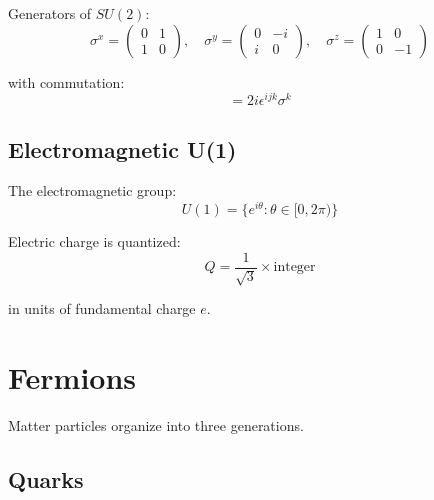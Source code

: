 \begin{theorem}
\label{fa_20:thm:pauli}
Generators of $SU(2)$:
\begin{equation}
\sigma^x = \begin{pmatrix}0 & 1 \\ 1 & 0\end{pmatrix}, \quad
\sigma^y = \begin{pmatrix}0 & -i \\ i & 0\end{pmatrix}, \quad
\sigma^z = \begin{pmatrix}1 & 0 \\ 0 & -1\end{pmatrix}
\end{equation}

with commutation:
\begin{equation}
[\sigma^i, \sigma^j] = 2i\epsilon^{ijk} \sigma^k
\end{equation}
\end{theorem}

\subsection{Electromagnetic U(1)}

\begin{definition}
\label{fa_20:def:u1}
The electromagnetic group:
\begin{equation}
U(1) = \{e^{i\theta} : \theta \in [0,2\pi)\}
\end{equation}
\end{definition}

\begin{proposition}
\label{fa_20:prop:u1-charge}
Electric charge is quantized:
\begin{equation}
Q = \frac{1}{\sqrt{3}} \times \text{integer}
\end{equation}

in units of fundamental charge $e$.
\end{proposition}

\section{Fermions}

Matter particles organize into three generations.

\subsection{Quarks}

